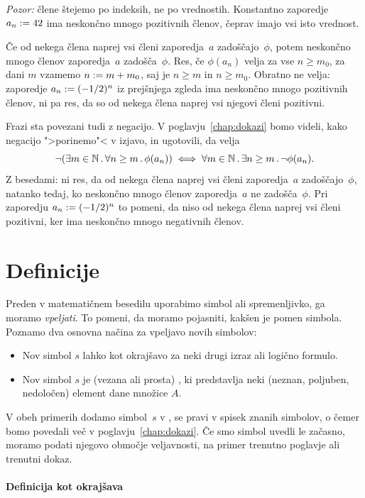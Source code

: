 \emph{Pozor:} člene štejemo po indeksih, ne po vrednostih. Konstantno zaporedje $a_n \mathrel{{:}{=}} 42$ ima neskončno mnogo pozitivnih členov, čeprav imajo vsi isto vrednost.

Če od nekega člena naprej vsi členi zaporedja~$a$ zadoščajo~$\phi$, potem neskončno mnogo členov zaporedja~$a$ zadošča~$\phi$.
%
Res, če $\phi(a_n)$ velja za vse $n \geq m_0$, za dani $m$ vzamemo $n \mathrel{{:}{=}} m + m_0$, saj je $n \geq m$ in $n \geq m_0$.
%
Obratno ne velja: zaporedje $a_n \mathrel{{:}{=}} (-1/2)^n$ iz prejšnjega zgleda ima neskončno mnogo pozitivnih členov, ni pa res, da so od nekega člena naprej vsi njegovi členi pozitivni.

Frazi sta povezani tudi z negacijo.
V poglavju~\ref{chap:dokazi} bomo videli, kako negacijo ">porinemo"< v izjavo, in ugotovili, da velja
%
\begin{equation*}
  \lnot (\exists m \in \mathbb{N} \,.\, \forall n \geq m \,.\, \phi(a_n))
  \iff
  \forall m \in \mathbb{N} \,.\, \exists n \geq m \,.\, \lnot\phi(a_n).
\end{equation*}
%
Z besedami: ni res, da od nekega člena naprej vsi členi zaporedja~$a$ zadoščajo~$\phi$, natanko tedaj, ko neskončno mnogo členov zaporedja~$a$ ne zadošča~$\phi$.
%
Pri zaporedju $a_n \mathrel{{:}{=}} (-1/2)^n$ to pomeni, da niso od nekega člena naprej vsi členi pozitivni, ker ima neskončno mnogo negativnih členov.

\section{Definicije}
\label{sec:definicije}

Preden v matematičnem besedilu uporabimo simbol ali spremenljivko, ga moramo \emph{vpeljati}. To pomeni, da moramo pojasniti, kakšen je pomen simbola. Poznamo dva osnovna načina za vpeljavo novih simbolov:
%
\begin{itemize}
\item Nov simbol $s$ lahko  kot okrajšavo za neki drugi izraz ali logično formulo.
\item Nov simbol $s$ je (vezana ali prosta) , ki predstavlja neki (neznan, poljuben, nedoločen) element dane množice $A$.
\end{itemize}
%
V obeh primerih dodamo simbol~$s$ v , se pravi v spisek znanih simbolov, o čemer bomo povedali več v poglavju~\ref{chap:dokazi}. Če smo simbol uvedli le začasno, moramo podati njegovo območje veljavnosti, na primer trenutno poglavje ali trenutni dokaz.

\paragraph*{Definicija kot okrajšava}

